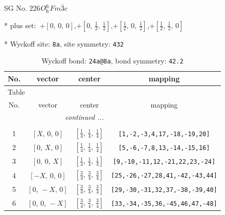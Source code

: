 \documentclass[fleqn,8pt]{jsarticle}
\begin{document}
\setcounter{MaxMatrixCols}{32}

\renewcommand{\tablename}{Table~}
\renewcommand{\figurename}{Figure~}
\begin{center}
\LARGE
SG No. 226\quad$O_{\rm h}^{6}$\quad$Fm\bar{3}c$\quad[ cubic ]
\end{center}

* plus set:\,\,\,$+\left[ 0,\, 0,\, 0 \right]$,\quad $+\left[ 0,\, \frac{1}{2},\, \frac{1}{2} \right]$,\quad $+\left[ \frac{1}{2},\, 0,\, \frac{1}{2} \right]$,\quad $+\left[ \frac{1}{2},\, \frac{1}{2},\, 0 \right]$


* Wyckoff site: {\tt 8a}, site symmetry: {\tt 432}
\renewcommand{\arraystretch}{1.2}
\begin{longtable}{cccc}
\caption{Wyckoff bond: {\tt 24a@8a}, bond symmetry: {\tt 42.2}}
 \\
 \hline \hline
No. & vector & center & mapping \\ \hline \endfirsthead

\multicolumn{3}{l}{\tablename\ \thetable{}} \\
 \hline \hline
No. & vector & center & mapping \\ \hline \endhead

 \hline \hline
\multicolumn{3}{r}{\footnotesize\it continued ...} \\ \endfoot

 \hline \hline
\multicolumn{3}{r}{} \\ \endlastfoot

1 & $\left[ X,\, 0,\, 0 \right]$ & $\left[ \frac{1}{4},\, \frac{1}{4},\, \frac{1}{4} \right]$ & {\tt [1,-2,-3,4,17,-18,-19,20]} \\ \hline
2 & $\left[ 0,\, X,\, 0 \right]$ & $\left[ \frac{1}{4},\, \frac{1}{4},\, \frac{1}{4} \right]$ & {\tt [5,-6,-7,8,13,-14,-15,16]} \\ \hline
3 & $\left[ 0,\, 0,\, X \right]$ & $\left[ \frac{1}{4},\, \frac{1}{4},\, \frac{1}{4} \right]$ & {\tt [9,-10,-11,12,-21,22,23,-24]} \\ \hline
4 & $\left[ - X,\, 0,\, 0 \right]$ & $\left[ \frac{3}{4},\, \frac{3}{4},\, \frac{3}{4} \right]$ & {\tt [25,-26,-27,28,41,-42,-43,44]} \\ \hline
5 & $\left[ 0,\, - X,\, 0 \right]$ & $\left[ \frac{3}{4},\, \frac{3}{4},\, \frac{3}{4} \right]$ & {\tt [29,-30,-31,32,37,-38,-39,40]} \\ \hline
6 & $\left[ 0,\, 0,\, - X \right]$ & $\left[ \frac{3}{4},\, \frac{3}{4},\, \frac{3}{4} \right]$ & {\tt [33,-34,-35,36,-45,46,47,-48]} \\
\end{longtable}
\end{document}
